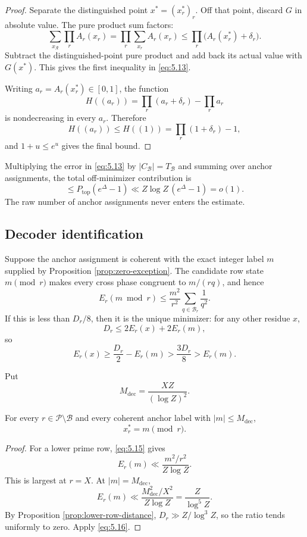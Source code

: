\begin{proof}
Separate the distinguished point $x^*=(x_r^*)_r$. Off that point, discard $G$ in absolute value. The pure product sum factors:
\[
\sum_{x_{\mathcal R}}\prod_rA_r(x_r)
=
\prod_r\sum_{x_r}A_r(x_r)
\le
\prod_r\bigl(A_r(x_r^*)+\delta_r\bigr).
\]
Subtract the distinguished-point pure product and add back its actual value with $G(x^*)$. This gives the first inequality in \eqref{eq:5.13}.

Writing $a_r=A_r(x_r^*)\in[0,1]$, the function
\[
H((a_r))
=
\prod_r(a_r+\delta_r)-\prod_ra_r
\]
is nondecreasing in every $a_r$. Therefore
\[
H((a_r))\le H((1))=
\prod_r(1+\delta_r)-1,
\]
and $1+u\le e^u$ gives the final bound.
\end{proof}

Multiplying the error in \eqref{eq:5.13} by $|C_{\mathcal B}|=T_{\mathcal B}$ and summing over anchor assignments, the total off-minimizer contribution is
\[
\le
P_{\mathrm{top}}(e^\Delta-1)
\ll
Z\log Z\,(e^\Delta-1)
=o(1).
\tag{5.14}\label{eq:5.14}
\]
The raw number of anchor assignments never enters the estimate.

\subsection{Decoder identification}

Suppose the anchor assignment is coherent with the exact integer label $m$ supplied by Proposition \ref{prop:zero-exception}. The candidate row state $m\pmod r$ makes every cross phase congruent to $m/(rq)$, and hence
\[
E_r(m\bmod r)
\le
\frac{m^2}{r^2}
\sum_{q\in\mathcal B_r}\frac1{q^2}.
\tag{5.15}\label{eq:5.15}
\]
If this is less than $D_r/8$, then it is the unique minimizer: for any other residue $x$,
\[
D_r\le2E_r(x)+2E_r(m),
\]
so
\[
E_r(x)
\ge\frac{D_r}{2}-E_r(m)
>
\frac{3D_r}{8}
>
E_r(m).
\tag{5.16}\label{eq:5.16}
\]

Put
\[
M_{\mathrm{dec}}
=
\frac{XZ}{(\log Z)^2}.
\tag{5.17}\label{eq:5.17}
\]

\begin{proposition}\label{prop:lower-decoder}
For every $r\in\mathcal P\setminus\mathcal B$ and every coherent anchor label with $|m|\le M_{\mathrm{dec}}$,
\[
x_r^*=m\pmod r.
\tag{5.18}\label{eq:5.18}
\]
\end{proposition}

\begin{proof}
For a lower prime row, \eqref{eq:5.15} gives
\[
E_r(m)\ll\frac{m^2/r^2}{Z\log Z}.
\]
This is largest at $r=X$. At $|m|=M_{\mathrm{dec}}$,
\[
E_r(m)
\ll
\frac{M_{\mathrm{dec}}^2/X^2}{Z\log Z}
=
\frac{Z}{\log^5Z}.
\]
By Proposition \ref{prop:lower-row-distance}, $D_r\gg Z/\log^3Z$, so the ratio tends uniformly to zero. Apply \eqref{eq:5.16}.
\end{proof}

